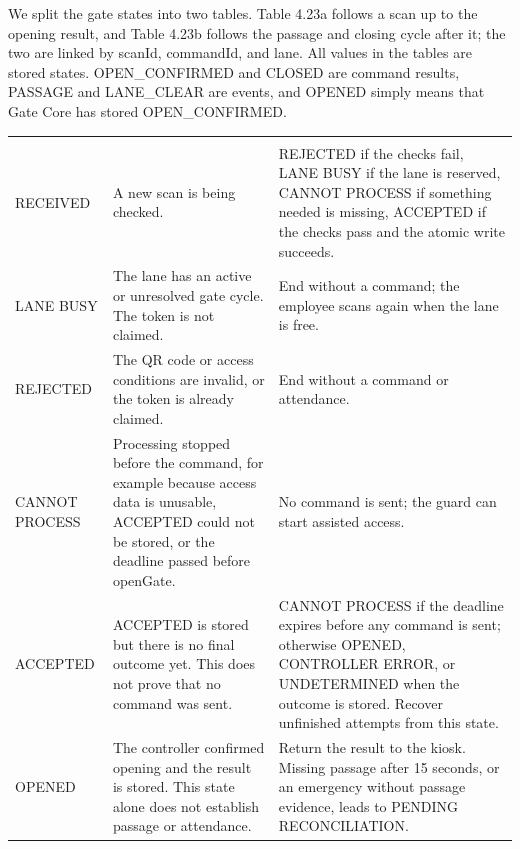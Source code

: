 We split the gate states into two tables. Table 4.23a follows a scan up to the opening result, and Table 4.23b follows the passage and closing cycle after it; the two are linked by scanId, commandId, and lane. All values in the tables are stored states. OPEN\_CONFIRMED and CLOSED are command results, PASSAGE and LANE\_CLEAR are events, and OPENED simply means that Gate Core has stored OPEN\_CONFIRMED.

\begin{longtable}{|>{\raggedright\arraybackslash}p{106.5pt}|>{\raggedright\arraybackslash}p{109.5pt}|>{\raggedright\arraybackslash}p{173.5pt}|}
\hline
\multicolumn{1}{|>{\columncolor{tableheader}\centering\arraybackslash}p{106.5pt}|}{\textbf{State}} & \multicolumn{1}{>{\columncolor{tableheader}\centering\arraybackslash}p{109.5pt}|}{\textbf{Meaning}} & \multicolumn{1}{>{\columncolor{tableheader}\centering\arraybackslash}p{173.5pt}|}{\textbf{Transition or Completion Conditions}} \\
\hline
\endhead
\multicolumn{3}{c}{\rule{0pt}{20pt}\normalsize\textbf{Table 4.23a. Scan States}} \\
\endlastfoot
RECEIVED & A new scan is being checked. & REJECTED if the checks fail, LANE BUSY if the lane is reserved, CANNOT PROCESS if something needed is missing, ACCEPTED if the checks pass and the atomic write succeeds. \\
\hline
LANE BUSY & The lane has an active or unresolved gate cycle. The token is not claimed. & End without a command; the employee scans again when the lane is free. \\
\hline
REJECTED & The QR code or access conditions are invalid, or the token is already claimed. & End without a command or attendance. \\
\hline
CANNOT PROCESS & Processing stopped before the command, for example because access data is unusable, ACCEPTED could not be stored, or the deadline passed before openGate. & No command is sent; the guard can start assisted access. \\
\hline
ACCEPTED & ACCEPTED is stored but there is no final outcome yet. This does not prove that no command was sent. & CANNOT PROCESS if the deadline expires before any command is sent; otherwise OPENED, CONTROLLER ERROR, or UNDETERMINED when the outcome is stored. Recover unfinished attempts from this state. \\
\hline
OPENED & The controller confirmed opening and the result is stored. This state alone does not establish passage or attendance. & Return the result to the kiosk. Missing passage after 15 seconds, or an emergency without passage evidence, leads to PENDING RECONCILIATION. \\

\end{longtable}
